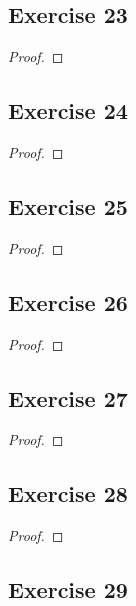 \documentclass[14pt]{extarticle}
\begin{document}
\subsection{Exercise 23}

\begin{proof}

\end{proof}

\subsection{Exercise 24}

\begin{proof}

\end{proof}

\subsection{Exercise 25}

\begin{proof}

\end{proof}

\subsection{Exercise 26}

\begin{proof}

\end{proof}

\subsection{Exercise 27}

\begin{proof}

\end{proof}

\subsection{Exercise 28}

\begin{proof}

\end{proof}

\subsection{Exercise 29}
\end{document}
